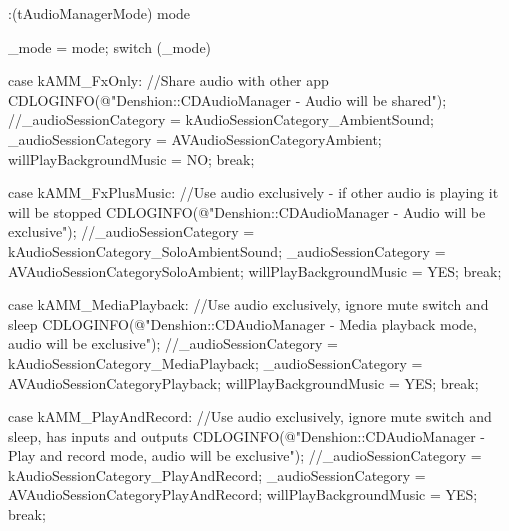 \begin{DoxyCode}
               :(tAudioManagerMode) mode {

        _mode = mode;
        switch (_mode) {

                case kAMM_FxOnly:
                        //Share audio with other app
                        CDLOGINFO(@"Denshion::CDAudioManager - Audio will be
       shared");
                        //_audioSessionCategory =
       kAudioSessionCategory_AmbientSound;
                        _audioSessionCategory = AVAudioSessionCategoryAmbient;
                        willPlayBackgroundMusic = NO;
                        break;

                case kAMM_FxPlusMusic:
                        //Use audio exclusively - if other audio is playing it
       will be stopped
                        CDLOGINFO(@"Denshion::CDAudioManager -  Audio will be
       exclusive");
                        //_audioSessionCategory =
       kAudioSessionCategory_SoloAmbientSound;
                        _audioSessionCategory = 
      AVAudioSessionCategorySoloAmbient;
                        willPlayBackgroundMusic = YES;
                        break;

                case kAMM_MediaPlayback:
                        //Use audio exclusively, ignore mute switch and sleep
                        CDLOGINFO(@"Denshion::CDAudioManager -  Media playback
       mode, audio will be exclusive");
                        //_audioSessionCategory =
       kAudioSessionCategory_MediaPlayback;
                        _audioSessionCategory = AVAudioSessionCategoryPlayback;
                        willPlayBackgroundMusic = YES;
                        break;

                case kAMM_PlayAndRecord:
                        //Use audio exclusively, ignore mute switch and sleep,
       has inputs and outputs
                        CDLOGINFO(@"Denshion::CDAudioManager -  Play and record
       mode, audio will be exclusive");
                        //_audioSessionCategory =
       kAudioSessionCategory_PlayAndRecord;
                        _audioSessionCategory = 
      AVAudioSessionCategoryPlayAndRecord;
                        willPlayBackgroundMusic = YES;
                        break;

}}
\end{DoxyCode}
